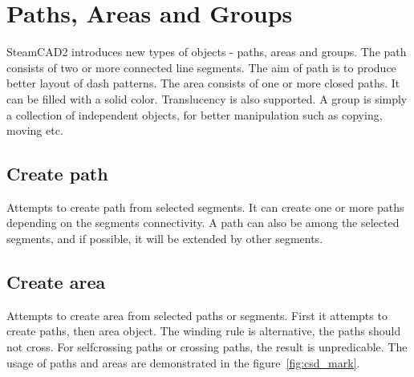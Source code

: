 \chapter{Paths, Areas and Groups}\label{chap:chap4}

SteamCAD2 introduces new types of objects - paths, areas and groups. The path consists of
two or more connected line segments. The aim of path is to produce better layout of dash patterns.
The area consists of one or more closed paths. It can be filled with a solid color. Translucency
is also supported. A group is simply a collection of independent objects, for better manipulation
such as copying, moving etc.

\section{Create path}\label{sec:createpath}

Attempts to create path from selected segments. It can create one or more paths depending on
the segments connectivity. A path can also be among the selected segments, and if possible,
it will be extended by other segments.

\section{Create area}\label{sec:createarea}

Attempts to create area from selected paths or segments. First it attempts to create paths,
then area object. The winding rule is alternative, the paths should not cross. For selfcrossing
paths or crossing paths, the result is unpredicable. The usage of paths and areas are demonstrated
in the figure~\ref{fig:csd_mark}.


